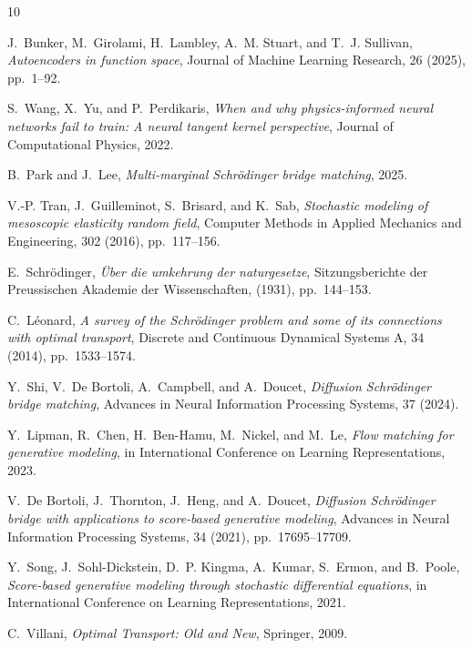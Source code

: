 \documentclass[review,onefignum,onetabnum]{siamart250211}
\newcommand{\1}{\mathbf{1}}
\begin{document}
\begin{thebibliography}{10}

{\sc J.~Bunker, M.~Girolami, H.~Lambley, A.~M. Stuart, and T.~J. Sullivan},
{\em Autoencoders in function space}, Journal of Machine Learning Research, 26 (2025),
pp.~1--92.

{\sc S.~Wang, X.~Yu, and P.~Perdikaris},
{\em When and why physics-informed neural networks fail to train: A neural tangent kernel perspective},
Journal of Computational Physics, 2022.

{\sc B.~Park and J.~Lee}, {\em Multi-marginal Schr\"odinger bridge matching}, 2025.

{\sc V.-P. Tran, J.~Guilleminot, S.~Brisard, and K.~Sab},
{\em Stochastic modeling of mesoscopic elasticity random field},
Computer Methods in Applied Mechanics and Engineering, 302 (2016), pp.~117--156.

{\sc E.~Schr\"odinger}, {\em {\"U}ber die umkehrung der naturgesetze},
Sitzungsberichte der Preussischen Akademie der Wissenschaften, (1931), pp.~144--153.

{\sc C.~L{\'e}onard},
{\em A survey of the Schr\"odinger problem and some of its connections with optimal transport},
Discrete and Continuous Dynamical Systems A, 34 (2014), pp.~1533--1574.

{\sc Y.~Shi, V.~De Bortoli, A.~Campbell, and A.~Doucet},
{\em Diffusion Schr\"odinger bridge matching},
Advances in Neural Information Processing Systems, 37 (2024).

{\sc Y.~Lipman, R.~Chen, H.~Ben-Hamu, M.~Nickel, and M.~Le},
{\em Flow matching for generative modeling},
in International Conference on Learning Representations, 2023.

{\sc V.~De Bortoli, J.~Thornton, J.~Heng, and A.~Doucet},
{\em Diffusion Schr\"odinger bridge with applications to score-based generative modeling},
Advances in Neural Information Processing Systems, 34 (2021), pp.~17695--17709.

{\sc Y.~Song, J.~Sohl-Dickstein, D.~P. Kingma, A.~Kumar, S.~Ermon, and B.~Poole},
{\em Score-based generative modeling through stochastic differential equations},
in International Conference on Learning Representations, 2021.

{\sc C.~Villani}, {\em Optimal Transport: Old and New}, Springer, 2009.


\end{thebibliography}
\end{document}
